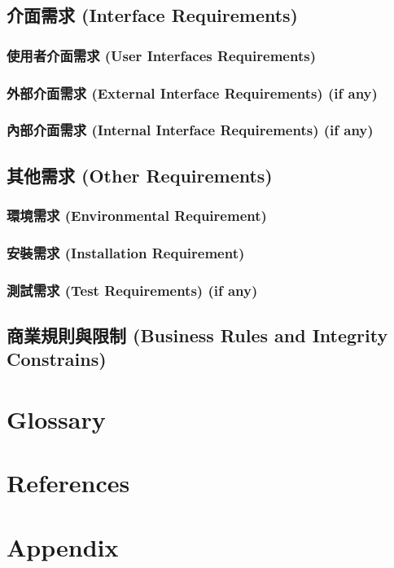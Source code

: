 \documentclass[a4paper, 12pt]{article}
\begin{document}
\subsection{介面需求 (Interface Requirements)}
\subsubsection{使用者介面需求 (User Interfaces Requirements)}
\subsubsection{外部介面需求 (External Interface Requirements) (if any)}
\subsubsection{內部介面需求 (Internal Interface Requirements) (if any)}
\subsection{其他需求 (Other Requirements)}
\subsubsection{環境需求 (Environmental Requirement)}
\subsubsection{安裝需求 (Installation Requirement)}
\subsubsection{測試需求 (Test Requirements) (if any)}
\subsection{商業規則與限制 (Business Rules and Integrity Constrains)}
\newpage

\section{Glossary}
\newpage

\section{References}
\printbibliography[heading=none]
\newpage

\section{Appendix}
\newpage
\end{document}
